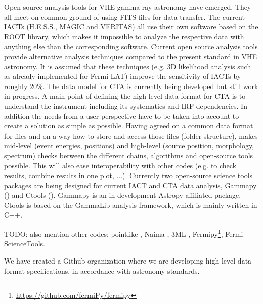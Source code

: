 Open source analysis tools for VHE gamma-ray astronomy have emerged. They all meet on common ground of using FITS files for data transfer. The current IACTs (H.E.S.S., MAGIC and VERITAS) all use their own software based on the ROOT library, which makes it impossible to analyze the respective data with anything else than the corresponding software. Current open source analysis tools provide alternative analysis techniques compared to the present standard in VHE astronomy. It is assumed that these techniques (e.g. 3D likelihood analysis such as already implemented for Fermi-LAT) improve the sensitivity of IACTs by roughly 20\%. The data model for CTA is currently being developed but still work in progress. A main point of defining the high level data format for CTA is to understand the instrument including its systematics and IRF dependencies. In addition the needs from a user perspective have to be taken into account to create a solution as simple as possible. Having agreed on a common data format for files and on a way how to store and access those files (folder structure), makes mid-level (event energies, positions) and high-level (source position, morphology, spectrum) checks between the different chains, algorithms and open-source tools possible. This will also ease interoperability with other codes (e.g. to check results, combine results in one plot, ...). Currently two open-source science tools packages are being designed for current IACT and CTA data analysis, Gammapy (\cite{2015arXiv150907408D}) and Ctools (\cite{2016AnA...593A...1K}). Gammapy is an in-development Astropy-affiliated package. Ctools is based on the GammaLib analysis framework, which is mainly written in C++.

TODO: also mention other codes: pointlike \citep{2010PhDT.......147K},
Naima \citep{2015arXiv150903319Z}, 3ML \citep{2015arXiv150708343V},
Fermipy\footnote{\url{https://github.com/fermiPy/fermipy}}, Fermi ScienceTools.

We have created a Github organization where we are developing high-level data format specifications, in accordance with astronomy standards. 
